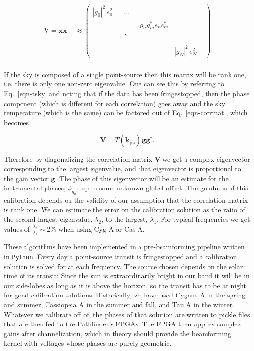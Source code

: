 \begin{align}
\label{eqn-corrmat}
\mathbf{V} = \mathbf{x} \mathbf{x}^\dagger &\approx \begin{pmatrix}
|g_0|^2\, e_0^2 &  & ... & & & \\ 
 &  &  & &  g_n g_m^* e_n e_m^*& \\ 
 &  &  \ddots & & & \\ 
 &  &  &  & & \\
&&&&&&\\
 &  &   &  & &  |g_N|^2 \, e_N^2
\end{pmatrix}
\end{align}
\\

If the sky is composed of a single point-source
then this matrix will be rank one, i.e. there is only one 
non-zero eigenvalue. One can see this by referring to Eq.~\ref{eqn-tsky} 
and noting that if the data has been fringestopped, then the phase 
component (which is different for each correlation) goes away and the 
sky temperature (which is the same) can be factored out of
Eq.~\ref{eqn-corrmat}, which becomes

\begin{equation}
\mathbf{V} = T(\mathbf{\hat{k}_{\textrm{ps}}}) \, \mathbf{g} \mathbf{g}^\dagger.
\end{equation}

\noindent Therefore by diagonalizing the correlation matrix $\mathbf{V}$ 
we get a complex eigenvector corresponding to the largest 
eigenvalue, and that eigenvector is proportional to the gain vector $\mathbf{g}$. 
The phase of this eigenvector will be an estimate for the instrumental 
phases, $\phi_{g_n}$, up to some unknown global offset. The goodness 
of this calibration depends on the validity of our assumption 
that the correlation matrix is rank one. We can estimate the 
error on the calibration solution as the ratio of the second largest 
eigenvalue, $\lambda_2$, to the largest, $\lambda_1$. For typical 
frequencies we get values of $\frac{\lambda_2}{\lambda_1}\sim2\%$ 
when using Cyg A or Cas A.

These algorithms have been implemented in a pre-beamforming 
pipeline written in {\tt Python}. Every day a point-source transit 
is fringestopped and a calibration solution is solved for 
at each frequency.
The source chosen depends on the solar time of its transit: Since the
sun is extraordinarily bright in our band it will be in our side-lobes 
as long as it is above the horizon,
so the transit has to be 
at night for good calibration solutions. Historically, 
we have used Cygnus A in the spring and summer, Cassiopeia A 
in the summer and fall, and Tau A in the winter. 
Whatever we calibrate off of, the phases of that solution are 
written to pickle files that are then fed to the Pathfinder's FPGAs.
The FPGA then applies complex gains after channelization, which 
in theory should provide the beamforming kernel with voltages 
whose phases are purely geometric. 

